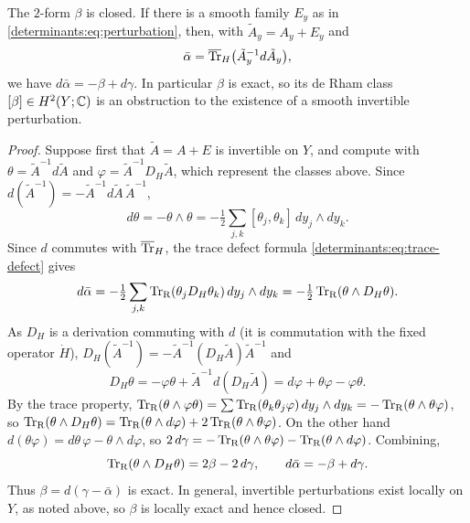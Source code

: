 \begin{proposition}\label{determinants:prop:variation}
  The $2$-form $\beta$ is closed. If there is a smooth family $E_y$ as in
  \eqref{determinants:eq:perturbation}, then, with $\tilde A_y=A_y+E_y$ and
  \begin{equation}\label{determinants:eq:alpha-bar}
    \bar\alpha=\overline{\operatorname{Tr}}_{H}\bigl(\tilde A_y^{-1}d\tilde A_y\bigr),
  \end{equation}
  we have $d\bar\alpha=-\beta+d\gamma$. In particular $\beta$ is exact, so its
  de Rham class $[\beta]\in H^2(Y;\mathbb{C})$ is an obstruction to the existence of
  a smooth invertible perturbation.
\end{proposition}
\begin{proof}
  Suppose first that $\tilde A=A+E$ is invertible on $Y$, and compute with
  $\theta=\tilde A^{-1}d\tilde A$ and $\varphi=\tilde A^{-1}D_H\tilde A$,
  which represent the classes above. Since $d(\tilde A^{-1})=-\tilde A^{-1}d\tilde A\,\tilde A^{-1}$,
  \begin{equation*}
    d\theta=-\theta\wedge\theta=-\tfrac12\sum_{j,k}[\theta_j,\theta_k]\,dy_j\wedge dy_k .
  \end{equation*}
  Since $d$ commutes with $\overline{\operatorname{Tr}}_{H}$, the trace defect formula
  \eqref{determinants:eq:trace-defect} gives
  \begin{equation*}
    d\bar\alpha=-\tfrac12\sum_{j,k}\operatorname{Tr}_{\mathrm{R}}(\theta_jD_H\theta_k)\,dy_j\wedge dy_k=-\tfrac12\operatorname{Tr}_{\mathrm{R}}(\theta\wedge D_H\theta).
  \end{equation*}
  As $D_H$ is a derivation commuting with $d$ (it is commutation with the fixed
  operator $\dot H$), $D_H(\tilde A^{-1})=-\tilde A^{-1}(D_H\tilde A)\tilde A^{-1}$
  and
  \begin{equation*}
    D_H\theta=-\varphi\theta+\tilde A^{-1}d(D_H\tilde A)=d\varphi+\theta\varphi-\varphi\theta .
  \end{equation*}
  By the trace property, $\operatorname{Tr}_{\mathrm{R}}(\theta\wedge\varphi\theta)=\sum\operatorname{Tr}_{\mathrm{R}}(\theta_k\theta_j\varphi)\,dy_j\wedge dy_k=-\operatorname{Tr}_{\mathrm{R}}(\theta\wedge\theta\varphi)$,
  so $\operatorname{Tr}_{\mathrm{R}}(\theta\wedge D_H\theta)=\operatorname{Tr}_{\mathrm{R}}(\theta\wedge d\varphi)+2\operatorname{Tr}_{\mathrm{R}}(\theta\wedge\theta\varphi)$.
  On the other hand $d(\theta\varphi)=d\theta\,\varphi-\theta\wedge d\varphi$, so
  $2\,d\gamma=-\operatorname{Tr}_{\mathrm{R}}(\theta\wedge\theta\varphi)-\operatorname{Tr}_{\mathrm{R}}(\theta\wedge d\varphi)$.
  Combining,
  \begin{equation*}
    \operatorname{Tr}_{\mathrm{R}}(\theta\wedge D_H\theta)=2\beta-2\,d\gamma,\qquad d\bar\alpha=-\beta+d\gamma .
  \end{equation*}
  Thus $\beta=d(\gamma-\bar\alpha)$ is exact. In general, invertible
  perturbations exist locally on $Y$, as noted above, so $\beta$ is locally
  exact and hence closed.
\end{proof}


